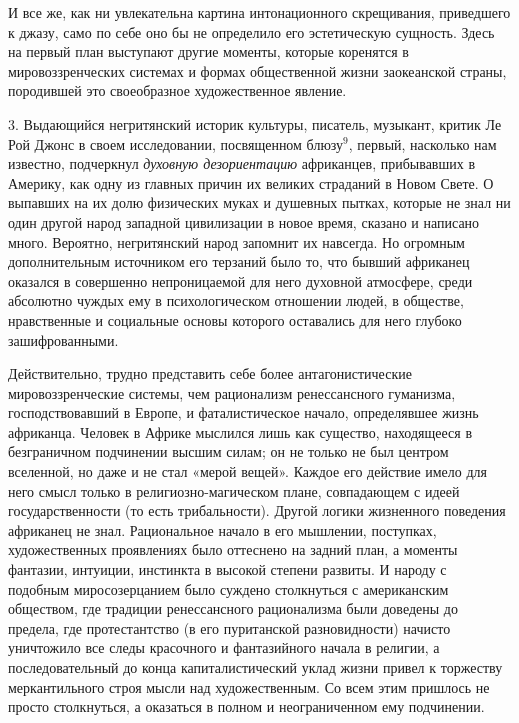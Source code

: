 И  все же,  как  ни увлекательна  картина интонационного  скрещивания,
приведшего к джазу, само по себе оно бы не определило его эстетическую
сущность.  Здесь  на первый  план  выступают  другие моменты,  которые
коренятся  в мировоззренческих  системах и  формах общественной  жизни
заокеанской   страны,  породившей   это  своеобразное   художественное
явление.

3.  Выдающийся  негритянский  историк  культуры,  писатель,  музыкант,
критик  Ле  Рой Джонс  в  своем  исследовании, посвященном  блюзу$^9$,
первый,    насколько   нам    известно,   подчеркнул    \emph{духовную
дезориентацию} африканцев, прибывавших в  Америку, как одну из главных
причин  их великих  страданий в  Новом Свете.  О выпавших  на их  долю
физических муках  и душевных  пытках, которые не  знал ни  один другой
народ западной  цивилизации в новое  время, сказано и  написано много.
Вероятно,  негритянский  народ  запомнит   их  навсегда.  Но  огромным
дополнительным источником  его терзаний было то,  что бывший африканец
оказался в совершенно непроницаемой для него духовной атмосфере, среди
абсолютно чуждых  ему в  психологическом отношении людей,  в обществе,
нравственные и социальные основы  которого оставались для него глубоко
зашифрованными.

Действительно,   трудно  представить   себе  более   антагонистические
мировоззренческие  системы, чем  рационализм ренессансного  гуманизма,
господствовавший  в  Европе,  и фаталистическое  начало,  определявшее
жизнь  африканца.  Человек  в   Африке  мыслился  лишь  как  существо,
находящееся в  безграничном подчинении высшим  силам; он не  только не
был центром  вселенной, но даже  и не  стал «мерой вещей».  Каждое его
действие имело  для него  смысл только в  религиозно-магическом плане,
совпадающем с  идеей государственности (то есть  трибальности). Другой
логики жизненного  поведения африканец не знал.  Рациональное начало в
его мышлении, поступках, художественных  проявлениях было оттеснено на
задний план, а моменты фантазии, интуиции, инстинкта в высокой степени
развиты. И народу с  подобным миросозерцанием было суждено столкнуться
с  американским  обществом,  где традиции  ренессансного  рационализма
были  доведены  до  предела,  где протестантство  (в  его  пуританской
разновидности) начисто уничтожило все  следы красочного и фантазийного
начала  в  религии,  а  последовательный  до  конца  капиталистический
уклад  жизни  привел  к   торжеству  меркантильного  строя  мысли  над
художественным.  Со  всем  этим  пришлось  не  просто  столкнуться,  а
оказаться в полном и неограниченном ему подчинении.

